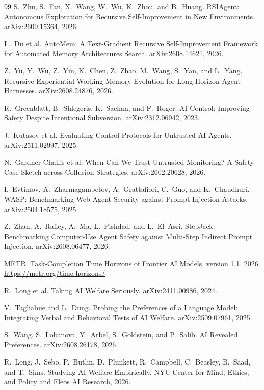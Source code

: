 \documentclass[11pt,a4paper]{article}
\begin{document}
\begin{thebibliography}{99}
 S.~Zhu, S.~Fan, X.~Wang, W.~Wu, K.~Zhou, and B.~Huang. RSIAgent: Autonomous Exploration for Recursive Self-Improvement in New Environments. arXiv:2609.15364, 2026.

 L.~Du et al. AutoMem: A Text-Gradient Recursive Self-Improvement Framework for Automated Memory Architectures Search. arXiv:2608.14621, 2026.

 Z.~Yu, Y.~Wu, Z.~Yin, K.~Chen, Z.~Zhao, M.~Wang, S.~Yan, and L.~Yang. Recursive Experiential-Working Memory Evolution for Long-Horizon Agent Harnesses. arXiv:2608.24876, 2026.

 R.~Greenblatt, B.~Shlegeris, K.~Sachan, and F.~Roger. AI Control: Improving Safety Despite Intentional Subversion. arXiv:2312.06942, 2023.

 J.~Kutasov et al. Evaluating Control Protocols for Untrusted AI Agents. arXiv:2511.02997, 2025.

 N.~Gardner-Challis et al. When Can We Trust Untrusted Monitoring? A Safety Case Sketch across Collusion Strategies. arXiv:2602.20628, 2026.

 I.~Evtimov, A.~Zharmagambetov, A.~Grattafiori, C.~Guo, and K.~Chaudhuri. WASP: Benchmarking Web Agent Security against Prompt Injection Attacks. arXiv:2504.18575, 2025.

 Z.~Zhan, A.~Rafiey, A.~Ma, L.~Pishdad, and L.~El~Asri. StepJack: Benchmarking Computer-Use Agent Safety against Multi-Step Indirect Prompt Injection. arXiv:2608.06477, 2026.

 METR. Task-Completion Time Horizons of Frontier AI Models, version 1.1. 2026. \url{https://metr.org/time-horizons/}

 R.~Long et al. Taking AI Welfare Seriously. arXiv:2411.00986, 2024.

 V.~Tagliabue and L.~Dung. Probing the Preferences of a Language Model: Integrating Verbal and Behavioral Tests of AI Welfare. arXiv:2509.07961, 2025.

 S.~Wang, S.~Lobanova, Y.~Arbel, S.~Goldstein, and P.~Salib. AI Revealed Preferences. arXiv:2608.26178, 2026.

 R.~Long, J.~Sebo, P.~Butlin, D.~Plunkett, R.~Campbell, C.~Beasley, B.~Saad, and T.~Sims. Studying AI Welfare Empirically. NYU Center for Mind, Ethics, and Policy and Eleos AI Research, 2026.


\end{thebibliography}
\end{document}
